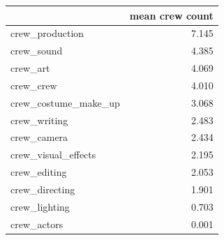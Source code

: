 \begin{tabular}{lr}
\toprule
 & mean crew count \\
\midrule
crew\_production & 7.145 \\
crew\_sound & 4.385 \\
crew\_art & 4.069 \\
crew\_crew & 4.010 \\
crew\_costume\_make\_up & 3.068 \\
crew\_writing & 2.483 \\
crew\_camera & 2.434 \\
crew\_visual\_effects & 2.195 \\
crew\_editing & 2.053 \\
crew\_directing & 1.901 \\
crew\_lighting & 0.703 \\
crew\_actors & 0.001 \\
\bottomrule
\end{tabular}